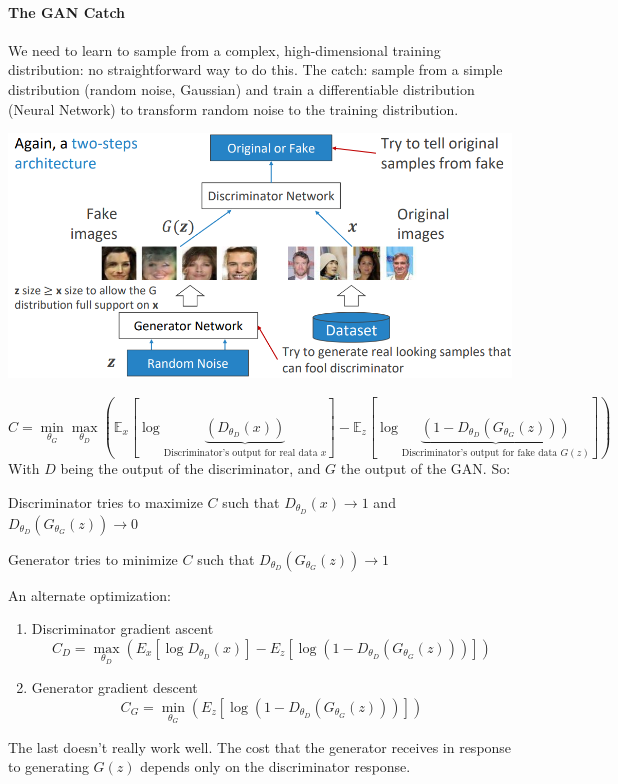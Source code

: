 \documentclass[10pt]{report}
\begin{document}
\paragraph{The GAN Catch} We need to learn to sample from a complex, high-dimensional training distribution: no straightforward way to do this. The catch: sample from a simple distribution (random noise, Gaussian) and train a differentiable distribution (Neural Network) to transform random noise to the training distribution.
\begin{center}
	\includegraphics[scale=0.5]{148.png}
\end{center}
$$C = \min_{\theta_G}\max_{\theta_D}\left(\mathbb{E}_x[\log\underset{\text{Discriminator's output for real data }x}{\underbrace{ (D_{\theta_D}(x))}}]-\mathbb{E}_z[\log\underset{\text{Discriminator's output for fake data }G(z)}{\underbrace{(1-D_{\theta_D}(G_{\theta_G}(z)))}}]\right)$$
With $D$ being the output of the discriminator, and $G$ the output of the GAN. So:
\begin{list}{}{}
	\item Discriminator tries to maximize $C$ such that $D_{\theta_D}(x)\rightarrow 1$ and $D_{\theta_D}(G_{\theta_G}(z))\rightarrow 0$
	\item Generator tries to minimize $C$ such that $D_{\theta_D}(G_{\theta_G}(z))\rightarrow 1$
\end{list}
An alternate optimization:\begin{enumerate}
\item Discriminator gradient ascent 
$$C_D = \max_{\theta_D}\left(E_x[\log D_{\theta_D}(x)]-E_z[\log(1-D_{\theta_D}(G_{\theta_G}(z)))]\right)$$
\item Generator gradient descent
$$C_G =  \min_{\theta_G}(E_z[\log(1-D_{\theta_D}(G_{\theta_G}(z)))])$$
\end{enumerate}
The last doesn't really work well. The cost that the generator receives in response to generating $G(z)$ depends only on the discriminator response.
\end{document}
